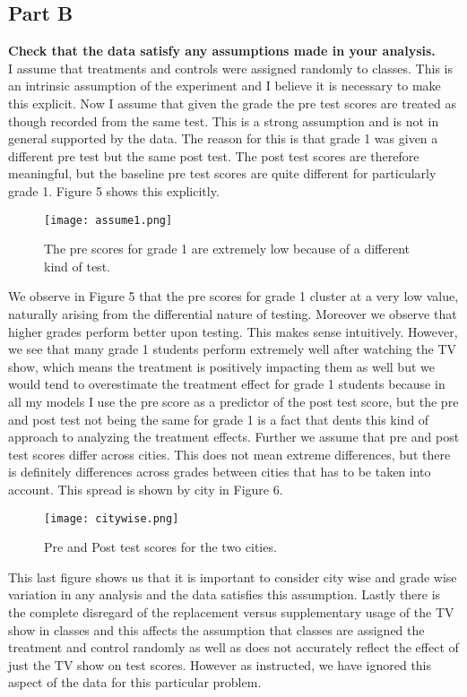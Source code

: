 \documentclass{article}
\begin{document}
\subsection{Part B}
\textbf{Check that the data satisfy any assumptions made in your analysis.}\\
I assume that treatments and controls were assigned randomly to classes. This is an intrinsic assumption of the experiment and I believe it is necessary to make this explicit. Now I assume that given the grade the pre test scores are treated as though recorded from the same test. This is a strong assumption and is not in general supported by the data. The reason for this is that grade 1 was given a different pre test but the same post test. The post test scores are therefore meaningful, but the baseline pre test scores are quite different for particularly grade 1. Figure 5 shows this explicitly.
\begin{figure}[H]
\centering
\texttt{[image: assume1.png]}
\caption{The pre scores for grade 1 are extremely low because of a different kind of test.}
\label{deltat}
\end{figure}
We observe in Figure 5 that the pre scores for grade 1 cluster at a very low value, naturally arising from the differential nature of testing. Moreover we observe that higher grades perform better upon testing. This makes sense intuitively. However, we see that many grade 1 students perform extremely well after watching the TV show, which means the treatment is positively impacting them as well but we would tend to overestimate the treatment effect for grade 1 students because in all my models I use the pre score as a predictor of the post test score, but the pre and post test not being the same for grade 1 is a fact that dents this kind of approach to analyzing the treatment effects.
Further we assume that pre and post test scores differ across cities. This does not mean extreme differences, but there is definitely differences across grades between cities that has to be taken into account. This spread is shown by city in Figure 6.
\begin{figure}[H]
\centering
\texttt{[image: citywise.png]}
\caption{ Pre and Post test scores for the two cities.}
\label{deltat}
\end{figure}
This last figure shows us that it is important to consider city wise and grade wise variation in any analysis and the data satisfies this assumption. Lastly there is the complete disregard of the replacement versus supplementary usage of the TV show in classes and this affects the assumption that classes are assigned the treatment and control randomly as well as does not accurately reflect the effect of just the TV show on test scores. However as instructed, we have ignored this aspect of the data for this particular problem.
\end{document}

